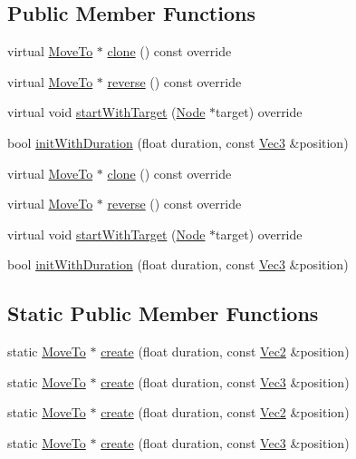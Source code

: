 \subsection*{Public Member Functions}
\begin{DoxyCompactItemize}
\item 
virtual \hyperlink{classMoveTo}{Move\+To} $\ast$ \hyperlink{classMoveTo_a0b5517ba663ab08cd69a51ba72b8e14c}{clone} () const override
\item 
virtual \hyperlink{classMoveTo}{Move\+To} $\ast$ \hyperlink{classMoveTo_afb568e581e69aad40f815e48eb13cb54}{reverse} () const override
\item 
virtual void \hyperlink{classMoveTo_af9f86e7c5d391fe494cf6a597b839b13}{start\+With\+Target} (\hyperlink{classNode}{Node} $\ast$target) override
\item 
bool \hyperlink{classMoveTo_acc1190010eef055d34d62e37ac242043}{init\+With\+Duration} (float duration, const \hyperlink{classVec3}{Vec3} \&position)
\item 
virtual \hyperlink{classMoveTo}{Move\+To} $\ast$ \hyperlink{classMoveTo_a9e164c0f1ef2a22a61377120e5463e60}{clone} () const override
\item 
virtual \hyperlink{classMoveTo}{Move\+To} $\ast$ \hyperlink{classMoveTo_a6113c5521a72f5e4a8ce56df5ab50722}{reverse} () const override
\item 
virtual void \hyperlink{classMoveTo_a434fce91e656b8f239cef63938fb29a6}{start\+With\+Target} (\hyperlink{classNode}{Node} $\ast$target) override
\item 
bool \hyperlink{classMoveTo_acc1190010eef055d34d62e37ac242043}{init\+With\+Duration} (float duration, const \hyperlink{classVec3}{Vec3} \&position)
\end{DoxyCompactItemize}
\subsection*{Static Public Member Functions}
\begin{DoxyCompactItemize}
\item 
static \hyperlink{classMoveTo}{Move\+To} $\ast$ \hyperlink{classMoveTo_a2a4a53041b9366c24c1b81675658c3bc}{create} (float duration, const \hyperlink{classVec2}{Vec2} \&position)
\item 
static \hyperlink{classMoveTo}{Move\+To} $\ast$ \hyperlink{classMoveTo_ae0e1c3414f367a02099be761f460ebec}{create} (float duration, const \hyperlink{classVec3}{Vec3} \&position)
\item 
static \hyperlink{classMoveTo}{Move\+To} $\ast$ \hyperlink{classMoveTo_afb7c4cb7967a65745add29e1a7ba0728}{create} (float duration, const \hyperlink{classVec2}{Vec2} \&position)
\item 
static \hyperlink{classMoveTo}{Move\+To} $\ast$ \hyperlink{classMoveTo_a50998e681b1f896e8e332effadd44194}{create} (float duration, const \hyperlink{classVec3}{Vec3} \&position)
\end{DoxyCompactItemize}

